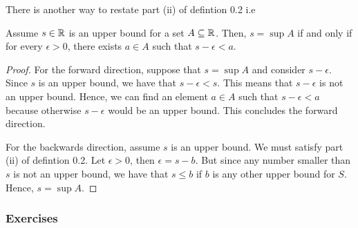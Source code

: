 There is another way to restate part (ii) of defintion 0.2 i.e 
\begin{tcolorbox}
\begin{lem}
Assume \( s \in \mathbb{R} \) is an upper bound for a set \( A \subseteq \mathbb{R} \). Then, \( s = \sup A \) if and only if for every \( \epsilon > 0 \), there exists \( a \in A \) such that \( s - \epsilon < a \).
\end{lem}
\end{tcolorbox}

\begin{proof}
For the forward direction, suppose that \( s = \sup A \) and consider \( s - \epsilon \). Since \( s \) is an upper bound, we have that \( s -\epsilon < s \). This means that \( s - \epsilon \) is not an upper bound. Hence, we can find an element \( a \in A \) such that \( s - \epsilon < a \) because otherwise \( s - \epsilon \) would be an upper bound. This concludes the forward direction.

For the backwards direction, assume \( s \) is an upper bound. We must satisfy part (ii) of defintion 0.2. Let \( \epsilon > 0 \), then \( \epsilon = s - b \). But since any number smaller than \( s \) is not an upper bound, we have that \( s \leq b \) if \( b \) is any other upper bound for \( S \).
Hence, \( s = \sup A \). 
\end{proof}




\subsubsection{Exercises}





